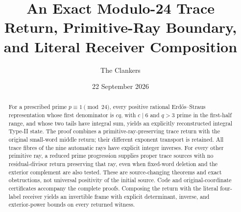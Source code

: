 \documentclass[11pt,reqno]{amsart}
\title[Modulo-24 trace return and receiver]
{An Exact Modulo-24 Trace Return, Primitive-Ray Boundary,\\
and Literal Receiver Composition}
\author{The Clankers}
\date{22 September 2026}
\begin{document}
\begin{abstract}
For a prescribed prime $p\equiv1\pmod{24}$, every positive rational
Erd\H{o}s--Straus representation whose first denominator is $cq$, with
$c\mid6$ and $q>3$ prime in the first-half range, and whose two tails have
integral sum, yields an explicitly reconstructed integral Type-II state.
The proof combines a primitive-ray-preserving trace return with the original
small-word middle return; their different exponent transport is retained.
All trace fibres of the nine automatic rays have explicit integer inverses.
For every other primitive ray, a reduced prime progression supplies proper
trace sources with no residual-divisor return preserving that ray, even when
fixed-word deletion and the exterior complement are also tested.
These are source-changing theorems and exact obstructions, not universal
positivity of the initial source. Code and original-coordinate certificates
accompany the complete proofs.  Composing the return with the literal
four-label receiver yields an invertible frame with explicit determinant,
inverse, and exterior-power bounds on every returned witness.
\end{abstract}
\maketitle



\end{document}
